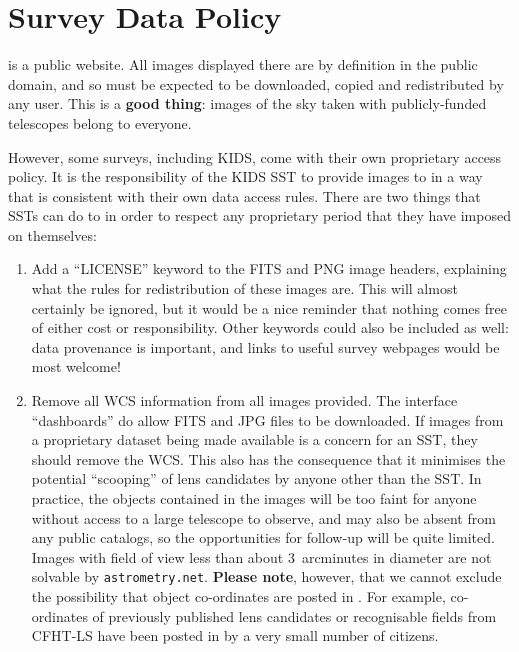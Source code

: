 \documentclass[a4paper,twocolumn]{article}
\begin{document}


\section{Survey Data Policy}
\label{sec:data}

\SW is a public website. All images displayed there are by definition in the
public domain, and so must be expected to be downloaded, copied and
redistributed by any \SW user. This is a \textbf{good thing}: images of the sky taken
with publicly-funded telescopes belong to everyone. 

However, some surveys, including KIDS, come with their own proprietary
access policy. It is the responsibility of the KIDS SST to provide
images to \SW in a way that is consistent with their own data access
rules. There are two things that SSTs can do to in order to respect
any proprietary period that they have imposed on themselves:
\begin{enumerate}

\item Add a ``LICENSE'' keyword to the FITS and PNG image headers, explaining
what the rules for redistribution of these images are. This will almost
certainly be ignored, but it would be a nice reminder that nothing comes free
of either cost or responsibility. Other keywords could also be included as
well: data provenance is important, and links to useful survey webpages would
be most welcome!

\item Remove all WCS information from all images provided. The \SW interface ``dashboards'' do allow FITS and JPG files to be downloaded. If images from a proprietary dataset being made available is a concern for an SST, they should remove the WCS. This also has the consequence that it minimises the potential ``scooping'' of  lens candidates by anyone other than the SST. 
In practice, the objects contained in the \SW images will be too faint
for anyone without access to a large telescope to observe, and may also be
absent from any public catalogs, so the opportunities for follow-up will be
quite limited. Images
with field of view less than about 3~arcminutes in diameter are not solvable
by \texttt{astrometry.net}. \textbf{Please note}, however, that we cannot exclude the possibility that object co-ordinates are posted in \Talk. For example, co-ordinates of previously published lens candidates or recognisable fields from CFHT-LS have been posted in \Talk by a very small number of citizens.

\end{enumerate}
\end{document}
